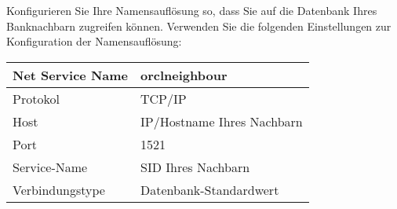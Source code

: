     \item Konfigurieren Sie Ihre Namensauflösung so, dass Sie auf die Datenbank Ihres Banknachbarn zugreifen können. Verwenden Sie die folgenden Einstellungen zur Konfiguration der Namensauflösung:

    \tabletail{
      \hline
    }
    \begin{supertabular}{|l|l|}
      \hline
      Net Service Name & orclneighbour\\
      \hline
      Protokol & TCP/IP \\
      \hline
      Host & IP/Hostname Ihres Nachbarn \\
      \hline
      Port & 1521 \\
      \hline
      Service-Name & SID Ihres Nachbarn \\
      \hline
      Verbindungstype & Datenbank-Standardwert\\
    \end{supertabular}
